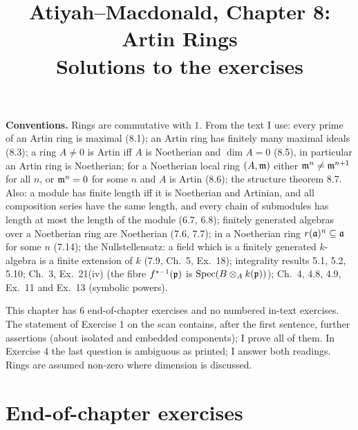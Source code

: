\documentclass[11pt]{article}
\title{Atiyah--Macdonald, Chapter 8: Artin Rings\\[2pt]\large Solutions to the exercises}
\author{}
\date{}
\begin{document}
\maketitle
\noindent\textbf{Conventions.} Rings are commutative with $1$. From the text I use: every prime of an Artin ring is maximal (8.1); an Artin ring has finitely many maximal ideals (8.3); a ring $A\ne0$ is Artin iff $A$ is Noetherian and $\dim A=0$ (8.5), in particular an Artin ring is Noetherian; for a Noetherian local ring $(A,\mathfrak m)$ either $\mathfrak m^n\ne\mathfrak m^{n+1}$ for all $n$, or $\mathfrak m^n=0$ for some $n$ and $A$ is Artin (8.6); the structure theorem 8.7. Also: a module has finite length iff it is Noetherian and Artinian, and all composition series have the same length, and every chain of submodules has length at most the length of the module (6.7, 6.8); finitely generated algebras over a Noetherian ring are Noetherian (7.6, 7.7); in a Noetherian ring $r(\mathfrak a)^n\subseteq\mathfrak a$ for some $n$ (7.14); the Nullstellensatz: a field which is a finitely generated $k$-algebra is a finite extension of $k$ (7.9, Ch.~5, Ex.~18); integrality results 5.1, 5.2, 5.10; Ch.~3, Ex.~21(iv) (the fibre $f^{*-1}(\mathfrak p)$ is $\operatorname{Spec}(B\otimes_Ak(\mathfrak p))$); Ch.~4, 4.8, 4.9, Ex.~11 and Ex.~13 (symbolic powers).

This chapter has 6 end-of-chapter exercises and no numbered in-text exercises. The statement of Exercise 1 on the scan contains, after the first sentence, further assertions (about isolated and embedded components); I prove all of them. In Exercise 4 the last question is ambiguous as printed; I answer both readings. Rings are assumed non-zero where dimension is discussed.

\section*{End-of-chapter exercises}
\end{document}
